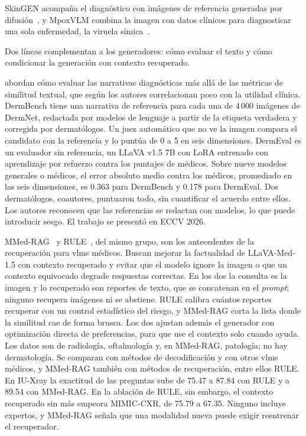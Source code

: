 SkinGEN acompaña el diagnóstico con imágenes de referencia generadas por difusión~\cite{lin2025skingen}, y MpoxVLM
combina la imagen con datos clínicos para diagnosticar una sola enfermedad, la viruela
símica~\cite{cao2024mpoxvlm}.

Dos líneas complementan a los generadores: cómo evaluar el texto y cómo condicionar la generación con contexto
recuperado.

\textcite{shen2025dermbench} abordan cómo evaluar las narrativas diagnósticas más allá de las métricas de similitud
textual, que según los autores correlacionan poco con la utilidad clínica. DermBench tiene una narrativa de
referencia para cada una de 4\,000 imágenes de DermNet, redactada por modelos de lenguaje a partir de la etiqueta
verdadera y corregida por dermatólogos. Un juez automático que no ve la imagen compara el candidato con la
referencia y lo puntúa de 0 a 5 en seis dimensiones. DermEval es un evaluador sin referencia, un LLaVA v1.5 7B con
LoRA entrenado con aprendizaje por refuerzo contra los puntajes de médicos. Sobre nueve modelos generales o médicos,
el error absoluto medio contra los médicos, promediado en las seis dimensiones, es 0.363 para DermBench y 0.178
para DermEval. Dos dermatólogos,
coautores, puntuaron todo, sin cuantificar el acuerdo entre ellos. Los autores reconocen que las referencias se
redactan con modelos, lo que puede introducir sesgo. El trabajo se presentó en ECCV 2026.

MMed-RAG~\cite{xia2025mmedrag} y RULE~\cite{xia2024rule}, del mismo grupo, son los antecedentes de la recuperación
para \glspl{vlm} médicos. Buscan mejorar la factualidad de LLaVA-Med-1.5 con contexto recuperado y evitar que el
modelo ignore la imagen o que un contexto equivocado degrade respuestas correctas. En los dos la consulta es la
imagen y lo recuperado son reportes de texto, que se concatenan en el \emph{prompt}; ninguno recupera imágenes ni se
abstiene. RULE calibra cuántos reportes recuperar con un control estadístico del riesgo, y MMed-RAG corta la lista
donde la similitud cae de forma brusca. Los dos ajustan además el generador con optimización directa de preferencias,
para que use el contexto solo cuando ayuda. Los datos son de radiología, oftalmología y, en MMed-RAG, patología; no
hay dermatología. Se comparan con métodos de decodificación y con otros \glspl{vlm} médicos, y MMed-RAG también
con métodos de recuperación, entre ellos RULE. En IU-Xray la exactitud
de las preguntas sube de 75.47 a 87.84 con RULE y a 89.54 con MMed-RAG. En la ablación de RULE, sin embargo, el
contexto recuperado sin más empeora MIMIC-CXR, de 75.79 a 67.35. Ninguno incluye expertos, y MMed-RAG señala que una
modalidad nueva puede exigir reentrenar el recuperador.

